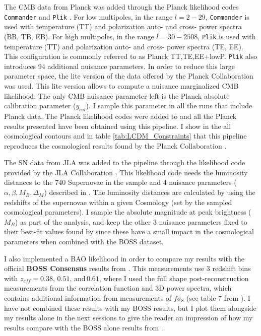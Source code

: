 \qquad The CMB data from Planck was added through the Planck likelihood codes \texttt{Commander} and \texttt{Plik} \citep{PlanckLikelihood2015}. For low multipoles, in the range $l=2-29$, \texttt{Commander} is used with temperature (TT) and polarization auto- and cross- power spectra (BB, TB, EB). For high multipoles, in the range $l=30-2508$, \texttt{Plik} is used with temperature (TT) and polarization auto- and cross- power spectra (TE, EE). This configuration is commonly referred to as Planck TT,TE,EE+lowP. \texttt{Plik} also introduces 94 additional nuisance parameters. In order to reduce this large parameter space, the lite version of the data offered by the Planck Collaboration was used. This lite version allows to compute a nuisance marginalized CMB likelihood. The only CMB nuisance parameter left is the Planck absolute calibration parameter ($y_{cal}$). I sample this parameter in all the runs that include Planck data. The Planck likelihood codes were added to \uclcl and all the Planck results presented have been obtained using this pipeline. I show in the all cosmological contours and in table \ref{tab:LCDM_Constraints} that this pipeline reproduces the cosmological results found by the Planck Collaboration \citep{PlanckCosmology2016}.

\qquad The SN data from JLA was added to the \uclcl pipeline through the likelihood code provided by the JLA Collaboration \citep{JLAdata}. This likelihood code needs the luminosity distances to the 740 Supernovae in the sample and 4 nuisance parameters ($\alpha, \beta, M_B, \Delta_M$) described in \cite{JLAdata}. The luminosity distances are calculated by \class \citep{Class} using the redshifts of the supernovae within a given Cosmology (set by the sampled cosmological parameters). I sample the absolute magnitude at peak brightness ($M_B$) as part of the analysis, and keep the other 3 nuisance parameters fixed to their best-fit values found by \cite{JLAdata} since these have a small impact in the cosmological parameters when combined with the BOSS dataset.

\qquad I also implemented a BAO likelihood in order to compare my results with the official \textbf{BOSS Consensus} results from \cite{2016BOSSCosmology}. This measurements use 3 redshift bins with $z_{eff} = 0.38, \, 0.51, \, \text{and} \, 0.61 $, where I used the full shape post-reconstruction measurements from the correlation function and 3D power spectra, which contains additional information from measurements of $f\sigma_8$ (see table 7 from \cite{2016BOSSCosmology}). I have not combined these results with my BOSS results, but I plot them alongside my results alone in the next sessions to give the reader an impression of how my results compare with the BOSS alone results from \cite{2016BOSSCosmology}.

